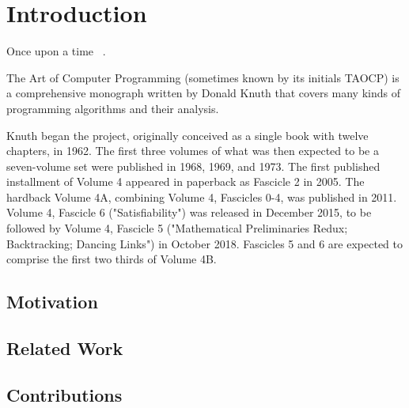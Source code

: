 \chapter{Introduction}
\minitoc
\vspace*{1cm}

Once upon a time ~\cite{cpp-recovery}.

The Art of Computer Programming (sometimes known by its initials TAOCP) is a
comprehensive monograph written by Donald Knuth that covers many kinds of
programming algorithms and their analysis.

Knuth began the project, originally conceived as a single book with twelve
chapters, in 1962. The first three volumes of what was then expected to be a
seven-volume set were published in 1968, 1969, and 1973. The first published
installment of Volume 4 appeared in paperback as Fascicle 2 in 2005. The
hardback Volume 4A, combining Volume 4, Fascicles 0-4, was published in 2011.
Volume 4, Fascicle 6 ("Satisfiability") was released in December 2015, to be
followed by Volume 4, Fascicle 5 ("Mathematical Preliminaries Redux;
Backtracking; Dancing Links") in October 2018. Fascicles 5 and 6 are expected
to comprise the first two thirds of Volume 4B.


\section{Motivation}

\section{Related Work}

\section{Contributions}
